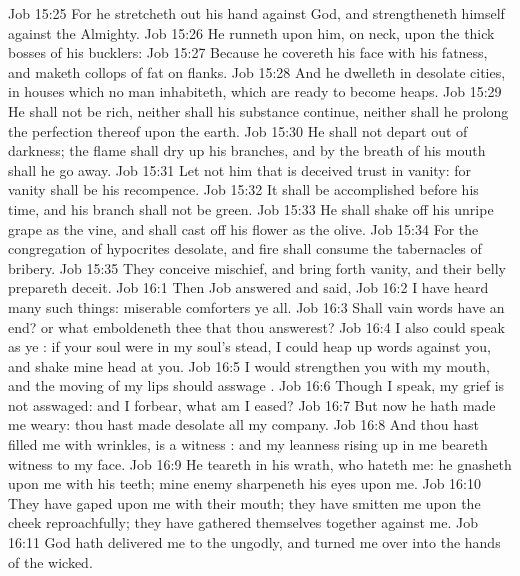 \vs Job 15:25 For he stretcheth out his hand against God, and strengtheneth himself against the Almighty.
\vs Job 15:26 He runneth upon him,  on  neck, upon the thick bosses of his bucklers:
\vs Job 15:27 Because he covereth his face with his fatness, and maketh collops of fat on  flanks.
\vs Job 15:28 And he dwelleth in desolate cities,  in houses which no man inhabiteth, which are ready to become heaps.
\vs Job 15:29 He shall not be rich, neither shall his substance continue, neither shall he prolong the perfection thereof upon the earth.
\vs Job 15:30 He shall not depart out of darkness; the flame shall dry up his branches, and by the breath of his mouth shall he go away.
\vs Job 15:31 Let not him that is deceived trust in vanity: for vanity shall be his recompence.
\vs Job 15:32 It shall be accomplished before his time, and his branch shall not be green.
\vs Job 15:33 He shall shake off his unripe grape as the vine, and shall cast off his flower as the olive.
\vs Job 15:34 For the congregation of hypocrites  desolate, and fire shall consume the tabernacles of bribery.
\vs Job 15:35 They conceive mischief, and bring forth vanity, and their belly prepareth deceit.
\vs Job 16:1 Then Job answered and said,
\vs Job 16:2 I have heard many such things: miserable comforters  ye all.
\vs Job 16:3 Shall vain words have an end? or what emboldeneth thee that thou answerest?
\vs Job 16:4 I also could speak as ye : if your soul were in my soul's stead, I could heap up words against you, and shake mine head at you.
\vs Job 16:5  I would strengthen you with my mouth, and the moving of my lips should asswage .
\vs Job 16:6 Though I speak, my grief is not asswaged: and  I forbear, what am I eased?
\vs Job 16:7 But now he hath made me weary: thou hast made desolate all my company.
\vs Job 16:8 And thou hast filled me with wrinkles,  is a witness : and my leanness rising up in me beareth witness to my face.
\vs Job 16:9 He teareth  in his wrath, who hateth me: he gnasheth upon me with his teeth; mine enemy sharpeneth his eyes upon me.
\vs Job 16:10 They have gaped upon me with their mouth; they have smitten me upon the cheek reproachfully; they have gathered themselves together against me.
\vs Job 16:11 God hath delivered me to the ungodly, and turned me over into the hands of the wicked.

